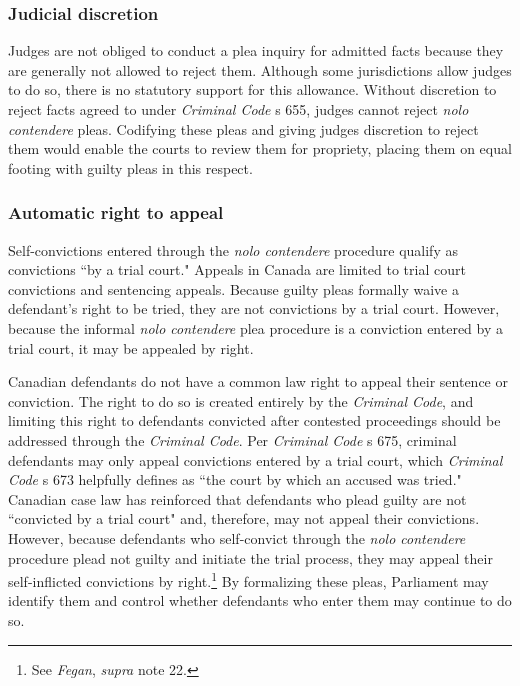 \subsubsection{Judicial discretion}

Judges are not obliged to conduct a plea inquiry for admitted facts because they are generally not allowed to reject them. Although some jurisdictions allow judges to do so, there is no statutory support for this allowance. Without discretion to reject facts agreed to under \textit{Criminal Code} s 655, judges cannot reject \textit{nolo contendere} pleas. Codifying these pleas and giving judges discretion to reject them would enable the courts to review them for propriety, placing them on equal footing with guilty pleas in this respect.

\subsubsection{Automatic right to appeal}

Self-convictions entered through the \textit{nolo contendere} procedure qualify as convictions ``by a trial court." Appeals in Canada are limited to trial court convictions and sentencing appeals. Because guilty pleas formally waive a defendant's right to be tried, they are not convictions by a trial court. However, because the informal \textit{nolo contendere} plea procedure is a conviction entered by a trial court, it may be appealed by right.

Canadian defendants do not have a common law right to appeal their sentence or conviction. The right to do so is created entirely by the \textit{Criminal Code}, and limiting this right to defendants convicted after contested proceedings should be addressed through the \textit{Criminal Code}. Per \textit{Criminal Code} s 675, criminal defendants may only appeal convictions entered by a trial court, which \textit{Criminal Code} s 673 helpfully defines as ``the court by which an accused was tried." Canadian case law has reinforced that defendants who plead guilty are not ``convicted by a trial court" and, therefore, may not appeal their convictions. However, because defendants who self-convict through the \textit{nolo contendere} procedure plead not guilty and initiate the trial process, they may appeal their self-inflicted convictions by right.\footnote{See \textit{Fegan}, \textit{supra} note 22.}  By formalizing these pleas, Parliament may identify them and control whether defendants who enter them may continue to do so.

